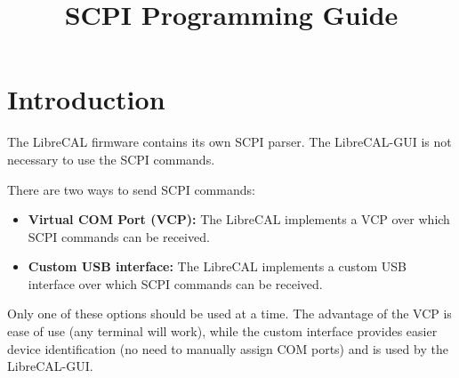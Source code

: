 \documentclass[a4paper,11pt]{article}
\title{\dev{} SCPI Programming Guide}
\newcommand{\dev}{LibreCAL}
\newcommand{\gui}{\dev{}-GUI}
\begin{document}
\maketitle

\setcounter{tocdepth}{3}
\tableofcontents

\clearpage

\section{Introduction}
The \dev{} firmware contains its own SCPI parser. The \gui{} is not necessary to use the SCPI commands.

There are two ways to send SCPI commands:
\begin{itemize}
\item \textbf{Virtual COM Port (VCP):} The \dev{} implements a VCP over which SCPI commands can be received.
\item \textbf{Custom USB interface:} The \dev{} implements a custom USB interface over which SCPI commands can be received.
\end{itemize}
Only one of these options should be used at a time. The advantage of the VCP is ease of use (any terminal will work), while the custom interface provides easier device identification (no need to manually assign COM ports) and is used by the \gui{}.
\end{document}
